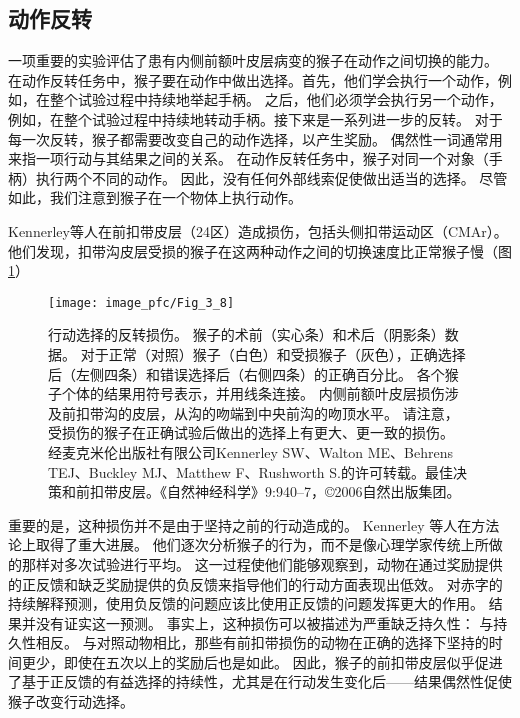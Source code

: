 \subsection{动作反转}

一项重要的实验评估了患有内侧前额叶皮层病变的猴子在动作之间切换的能力\cite{kennerley2006optimal}。
在动作反转任务中，猴子要在动作中做出选择。首先，他们学会执行一个动作，例如，在整个试验过程中持续地举起手柄。
之后，他们必须学会执行另一个动作，例如，在整个试验过程中持续地转动手柄。接下来是一系列进一步的反转。
对于每一次反转，猴子都需要改变自己的动作选择，以产生奖励。
偶然性一词通常用来指一项行动与其结果之间的关系。
在动作反转任务中，猴子对同一个对象（手柄）执行两个不同的动作。
因此，没有任何外部线索促使做出适当的选择。
尽管如此，我们注意到猴子在一个物体上执行动作。\par
Kennerley等人在前扣带皮层（24区）造成损伤，包括头侧扣带运动区（CMAr）。
他们发现，扣带沟皮层受损的猴子在这两种动作之间的切换速度比正常猴子慢（图\ref{fig:3_8}）\par


\begin{figure}[!htb]
	\centering
 	\texttt{[image: image\_pfc/Fig\_3\_8]}
	\caption{行动选择的反转损伤。
		猴子的术前（实心条）和术后（阴影条）数据。
		对于正常（对照）猴子（白色）和受损猴子（灰色），正确选择后（左侧四条）和错误选择后（右侧四条）的正确百分比。
		各个猴子个体的结果用符号表示，并用线条连接。
		内侧前额叶皮层损伤涉及前扣带沟的皮层，从沟的吻端到中央前沟的吻顶水平。
		请注意，受损伤的猴子在正确试验后做出的选择上有更大、更一致的损伤。
		经麦克米伦出版社有限公司Kennerley SW、Walton ME、Behrens TEJ、Buckley MJ、Matthew F、Rushworth S.的许可转载。最佳决策和前扣带皮层。《自然神经科学》9:940–7，©2006自然出版集团。}
	\label{fig:3_8}
\end{figure}


重要的是，这种损伤并不是由于坚持之前的行动造成的。
Kennerley 等人在方法论上取得了重大进展。 他们逐次分析猴子的行为，而不是像心理学家传统上所做的那样对多次试验进行平均。
这一过程使他们能够观察到，动物在通过奖励提供的正反馈和缺乏奖励提供的负反馈来指导他们的行动方面表现出低效。
对赤字的持续解释预测，使用负反馈的问题应该比使用正反馈的问题发挥更大的作用。
结果并没有证实这一预测。
事实上，这种损伤可以被描述为严重缺乏持久性：
与持久性相反。
与对照动物相比，那些有前扣带损伤的动物在正确的选择下坚持的时间更少，即使在五次以上的奖励后也是如此。
因此，猴子的前扣带皮层似乎促进了基于正反馈的有益选择的持续性，尤其是在行动发生变化后——结果偶然性促使猴子改变行动选择。\par


